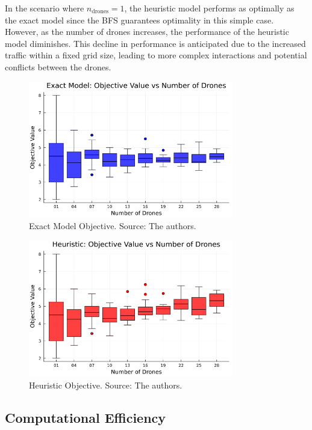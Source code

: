 In the scenario where $n_{\text{drones}} = 1$, the heuristic model performs as optimally as the exact model since the BFS guarantees optimality in this simple case. However, as the number of drones increases, the performance of the heuristic model diminishes. This decline in performance is anticipated due to the increased traffic within a fixed grid size, leading to more complex interactions and potential conflicts between the drones.


\begin{figure}[H]
    \centering
    \includegraphics[width=0.8\textwidth]{img/julia_obj_boxplot_vs_drones.png}
    \caption{Exact Model Objective. Source: The authors.}
    \label{fig:exact_model_obj}
\end{figure}

\begin{figure}[H]
    \centering
    \includegraphics[width=0.8\textwidth]{img/cpp_obj_boxplot_vs_drones.png}
    \caption{Heuristic Objective. Source: The authors.}
    \label{fig:heuristic_obj}
\end{figure}


\subsection{Computational Efficiency}

